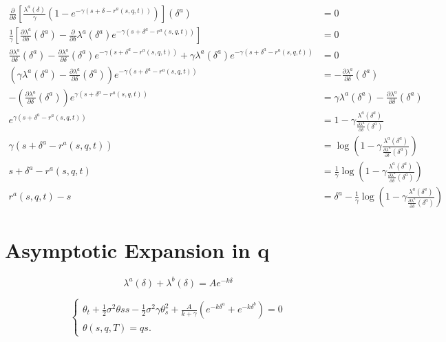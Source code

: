 \begin{align*}
    \frac{\partial}{\partial\delta}\left[\frac{\lambda^a(\delta)}{\gamma}(1-e^{-\gamma(s+\delta-r^a(s,q,t))})\right](\delta^a)&=0\\
    \frac{1}{\gamma}\left[\frac{\partial\lambda^a}{\partial\delta}(\delta^a)-\frac{\partial}{\partial\delta}\lambda^a(\delta^a)e^{-\gamma(s+\delta^a-r^a(s,q,t))}\right]&=0\\
    \frac{\partial\lambda^a}{\partial\delta}(\delta^a)-\frac{\partial\lambda^a}{\partial\delta}(\delta^a)e^{-\gamma(s+\delta^a-r^a(s,q,t))}+\gamma\lambda^a(\delta^a)e^{-\gamma(s+\delta^a-r^a(s,q,t))}&=0\\
    \left(\gamma\lambda^a(\delta^a)-\frac{\partial\lambda^a}{\partial\delta}(\delta^a)\right)e^{-\gamma(s+\delta^a-r^a(s,q,t))}&=-\frac{\partial\lambda^a}{\partial\delta}(\delta^a)\\
    -\left(\frac{\partial\lambda^a}{\partial\delta}(\delta^a)\right)e^{\gamma(s+\delta^a-r^a(s,q,t))}&=\gamma\lambda^a(\delta^a)-\frac{\partial\lambda^a}{\partial\delta}(\delta^a)\\
    e^{\gamma(s+\delta^a-r^a(s,q,t))}&=1-\gamma\frac{\lambda^a(\delta^a)}{\frac{\partial\lambda^a}{\partial\delta}(\delta^a)}\\
    \gamma(s+\delta^a-r^a(s,q,t))&=\log\left(1-\gamma\frac{\lambda^a(\delta^a)}{\frac{\partial\lambda^a}{\partial\delta}(\delta^a)}\right)\\
    s+\delta^a-r^a(s,q,t)&=\frac{1}{\gamma}\log\left(1-\gamma\frac{\lambda^a(\delta^a)}{\frac{\partial\lambda^a}{\partial\delta}(\delta^a)}\right)\\
    r^a(s,q,t)-s&=\delta^a-\frac{1}{\gamma}\log\left(1-\gamma\frac{\lambda^a(\delta^a)}{\frac{\partial\lambda^a}{\partial\delta}(\delta^a)}\right)
\end{align*}

\section{Asymptotic Expansion in q}
\begin{equation}
    \lambda^a(\delta)+\lambda^b(\delta)=Ae^{-k\delta}
\end{equation}

\begin{equation} 
    \begin{cases} 
        \theta_t+\frac{1}{2}\sigma^2\theta{ss}-\frac{1}{2}\sigma^2\gamma\theta^2_s+\frac{A}{k+\gamma}(e^{-k\delta^a}+e^{-k\delta^b})=0\\
        \theta(s,q,T)=qs.
    \end{cases}
\end{equation}

